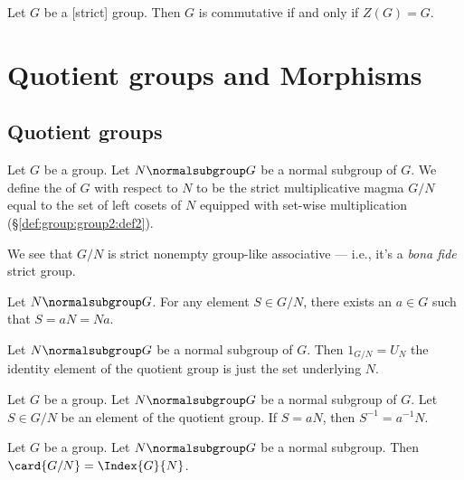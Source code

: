 \begin{theorem}
Let $G$ be a [strict] group.
Then $G$ is commutative if and only if $Z(G)=G$.
\end{theorem}

\section{Quotient groups and Morphisms}

\subsection{Quotient groups}

\begin{definition}
Let $G$ be a group. Let $N\normalsubgroup G$ be a normal subgroup of $G$.
We define the  of $G$ with respect to $N$ to be
the strict multiplicative magma $G/N$ equal to the set of left cosets
of $N$ equipped with set-wise multiplication (\S\ref{def:group:group2:def2}).

We see that $G/N$ is strict nonempty group-like associative --- i.e.,
it's a \emph{bona fide} strict group.
\end{definition}

\begin{theorem}
Let $N\normalsubgroup G$.
For any element $S\in G/N$, there exists an $a\in G$ such that $S=aN=Na$.
\end{theorem}

\begin{theorem}
Let $N\normalsubgroup G$ be a normal subgroup of $G$.
Then $1_{G/N}=U_{N}$ the identity element of the quotient group is
just the set underlying $N$.
\end{theorem}

\begin{theorem}
Let $G$ be a group. Let $N\normalsubgroup G$ be a normal subgroup of $G$.
Let $S\in G/N$ be an element of the quotient group. 
If $S=aN$, then $S^{-1}=a^{-1}N$.
\end{theorem}

\begin{theorem}
Let $G$ be a group. Let $N\normalsubgroup G$ be a normal subgroup.
Then $\card{G/N}=\Index{G}{N}$.
\end{theorem}

